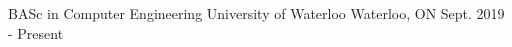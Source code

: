 

\begin{cventries}

  \cventry
    {BASc in Computer Engineering} %
    {University of Waterloo} %
    {Waterloo, ON} %
    {Sept. 2019 - Present} %
    {}

\end{cventries}
